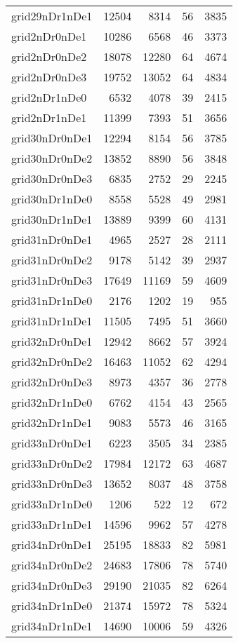 \begin{longtable}{lrrrr}
grid29nDr1nDe1 & 12504 & 8314 & 56 & 3835 \\
grid2nDr0nDe1 & 10286 & 6568 & 46 & 3373 \\
grid2nDr0nDe2 & 18078 & 12280 & 64 & 4674 \\
grid2nDr0nDe3 & 19752 & 13052 & 64 & 4834 \\
grid2nDr1nDe0 & 6532 & 4078 & 39 & 2415 \\
grid2nDr1nDe1 & 11399 & 7393 & 51 & 3656 \\
grid30nDr0nDe1 & 12294 & 8154 & 56 & 3785 \\
grid30nDr0nDe2 & 13852 & 8890 & 56 & 3848 \\
grid30nDr0nDe3 & 6835 & 2752 & 29 & 2245 \\
grid30nDr1nDe0 & 8558 & 5528 & 49 & 2981 \\
grid30nDr1nDe1 & 13889 & 9399 & 60 & 4131 \\
grid31nDr0nDe1 & 4965 & 2527 & 28 & 2111 \\
grid31nDr0nDe2 & 9178 & 5142 & 39 & 2937 \\
grid31nDr0nDe3 & 17649 & 11169 & 59 & 4609 \\
grid31nDr1nDe0 & 2176 & 1202 & 19 & 955 \\
grid31nDr1nDe1 & 11505 & 7495 & 51 & 3660 \\
grid32nDr0nDe1 & 12942 & 8662 & 57 & 3924 \\
grid32nDr0nDe2 & 16463 & 11052 & 62 & 4294 \\
grid32nDr0nDe3 & 8973 & 4357 & 36 & 2778 \\
grid32nDr1nDe0 & 6762 & 4154 & 43 & 2565 \\
grid32nDr1nDe1 & 9083 & 5573 & 46 & 3165 \\
grid33nDr0nDe1 & 6223 & 3505 & 34 & 2385 \\
grid33nDr0nDe2 & 17984 & 12172 & 63 & 4687 \\
grid33nDr0nDe3 & 13652 & 8037 & 48 & 3758 \\
grid33nDr1nDe0 & 1206 & 522 & 12 & 672 \\
grid33nDr1nDe1 & 14596 & 9962 & 57 & 4278 \\
grid34nDr0nDe1 & 25195 & 18833 & 82 & 5981 \\
grid34nDr0nDe2 & 24683 & 17806 & 78 & 5740 \\
grid34nDr0nDe3 & 29190 & 21035 & 82 & 6264 \\
grid34nDr1nDe0 & 21374 & 15972 & 78 & 5324 \\
grid34nDr1nDe1 & 14690 & 10006 & 59 & 4326 \\

\end{longtable}
